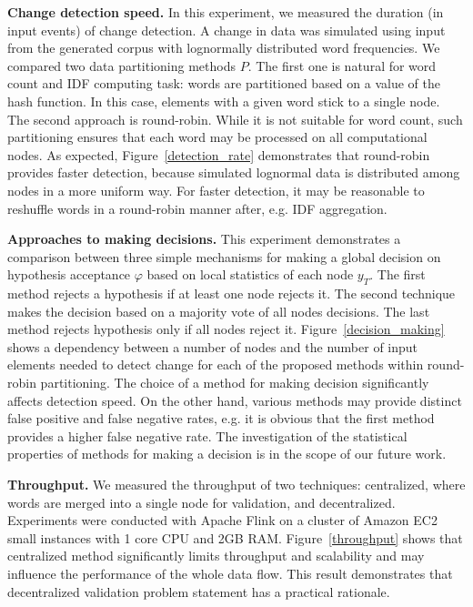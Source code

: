 {\bf Change detection speed.} In this experiment, we measured the duration (in input events) of change detection. A change in data was simulated using input from the generated corpus with lognormally distributed word frequencies. We compared two data partitioning methods $P$. The first one is natural for word count and IDF computing task: words are partitioned based on a value of the hash function. In this case, elements with a given word stick to a single node. The second approach is round-robin. While it is not suitable for word count, such partitioning ensures that each word may be processed on all computational nodes. As expected, Figure~\ref{detection_rate} demonstrates that round-robin provides faster detection, because simulated lognormal data is distributed among nodes in a more uniform way. For faster detection, it may be reasonable to reshuffle words in a round-robin manner after, e.g. IDF aggregation.

{\bf Approaches to making decisions.} This experiment demonstrates a comparison between three simple mechanisms for making a global decision on hypothesis acceptance $\varphi$ based on local statistics of each node $y_T$. The first method rejects a hypothesis if at least one node rejects it. The second technique makes the decision based on a majority vote of all nodes decisions. The last method rejects hypothesis only if all nodes reject it. Figure~\ref{decision_making} shows a dependency between a number of nodes and the number of input elements needed to detect change for each of the proposed methods within round-robin partitioning. The choice of a method for making decision significantly affects detection speed. On the other hand, various methods may provide distinct false positive and false negative rates, e.g. it is obvious that the first method provides a higher false negative rate. The investigation of the statistical properties of methods for making a decision is in the scope of our future work.

{\bf Throughput.} We measured the throughput of two techniques: centralized, where words are merged into a single node for validation, and decentralized. Experiments were conducted with Apache Flink on a cluster of Amazon EC2 small instances with 1 core CPU and 2GB RAM. Figure~\ref{throughput} shows that centralized method significantly limits throughput and scalability and may influence the performance of the whole data flow. This result demonstrates that decentralized validation problem statement has a practical rationale.